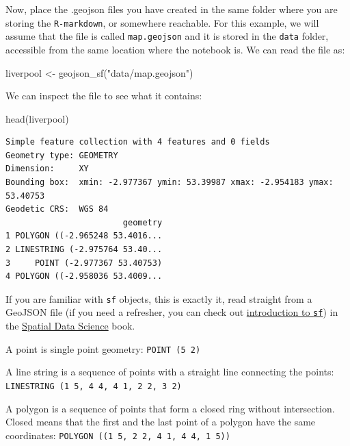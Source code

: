 \documentclass[
  letterpaper,
  DIV=11,
  numbers=noendperiod]{scrreprt}
\newenvironment{Shaded}{\begin{snugshade}}{\end{snugshade}}
\newcommand{\FunctionTok}[1]{\textcolor[rgb]{0.28,0.35,0.67}{#1}}
\newcommand{\NormalTok}[1]{\textcolor[rgb]{0.00,0.23,0.31}{#1}}
\newcommand{\OtherTok}[1]{\textcolor[rgb]{0.00,0.23,0.31}{#1}}
\newcommand{\StringTok}[1]{\textcolor[rgb]{0.13,0.47,0.30}{#1}}
\begin{document}
Now, place the .geojson files you have created in the same folder where
you are storing the \texttt{R-markdown}, or somewhere reachable. For
this example, we will assume that the file is called
\texttt{map.geojson} and it is stored in the \texttt{data} folder,
accessible from the same location where the notebook is. We can read the
file as:

\begin{Shaded}
\begin{Highlighting}[]
\NormalTok{liverpool }\OtherTok{\textless{}{-}} \FunctionTok{geojson\_sf}\NormalTok{(}\StringTok{"data/map.geojson"}\NormalTok{)}
\end{Highlighting}
\end{Shaded}

We can inspect the file to see what it contains:

\begin{Shaded}
\begin{Highlighting}[]
\FunctionTok{head}\NormalTok{(liverpool)}
\end{Highlighting}
\end{Shaded}

\begin{verbatim}
Simple feature collection with 4 features and 0 fields
Geometry type: GEOMETRY
Dimension:     XY
Bounding box:  xmin: -2.977367 ymin: 53.39987 xmax: -2.954183 ymax: 53.40753
Geodetic CRS:  WGS 84
                        geometry
1 POLYGON ((-2.965248 53.4016...
2 LINESTRING (-2.975764 53.40...
3     POINT (-2.977367 53.40753)
4 POLYGON ((-2.958036 53.4009...
\end{verbatim}

If you are familiar with \texttt{sf} objects, this is exactly it, read
straight from a GeoJSON file (if you need a refresher, you can check out
\href{https://r-spatial.org/book/07-Introsf.html}{introduction to
\texttt{sf}}) in the \href{https://r-spatial.org/book/}{Spatial Data
Science} book.

 A point is single point geometry:
\texttt{POINT\ (5\ 2)}

 A line string is a sequence of points with a
straight line connecting the points:
\texttt{LINESTRING\ (1\ 5,\ 4\ 4,\ 4\ 1,\ 2\ 2,\ 3\ 2)}

 A polygon is a sequence of points that form a closed
ring without intersection. Closed means that the first and the last
point of a polygon have the same coordinates:
\texttt{POLYGON\ ((1\ 5,\ 2\ 2,\ 4\ 1,\ 4\ 4,\ 1\ 5))}
\end{document}

